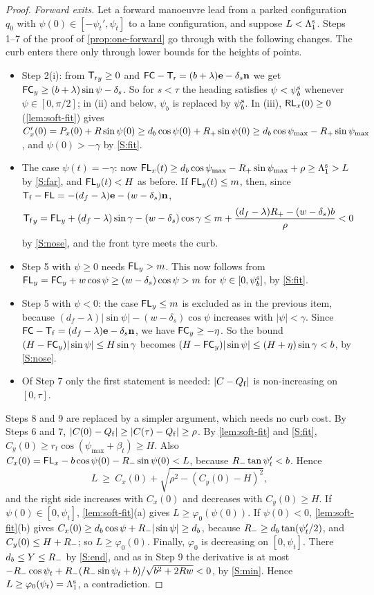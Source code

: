 \begin{proof}
\emph{Forward exits.}
Let a forward manoeuvre lead from a parked configuration $q_0$ with $\psi(0)\in[-\psi_t',\psi_t]$ to a lane configuration, and suppose $L<\Lambda_1^{\rm s}$.
Steps 1--7 of the proof of \cref{prop:one-forward} go through with the following changes.
The curb enters there only through lower bounds for the heights of points.
\begin{itemize}[nosep]
\item Step 2(i): from $\mathsf{T_r}_y\ge0$ and $\mathsf{FC}-\mathsf{T_r}=(b+\lambda)\mathbf{e}-\delta_s\mathbf{n}$ we get $\mathsf{FC}_y\ge(b+\lambda)\sin\psi-\delta_s$.
So for $s<\tau$ the heading satisfies $\psi<\psi_b^{\rm s}$ whenever $\psi\in[0,\pi/2]$; in (ii) and below, $\psi_b$ is replaced by $\psi_b^{\rm s}$.
In (iii), $\mathsf{RL}_x(0)\ge0$ (\cref{lem:soft-fit}) gives $C'_x(0)=P_x(0)+R\sin\psi(0)\ge d_b\cos\psi(0)+R_{+}\sin\psi(0)\ge d_b\cos\psi_{\max}-R_{+}\sin\psi_{\max}$, and $\psi(0)>-\gamma$ by \ref{S:fit}.
\item The case $\psi(t)=-\gamma$: now $\mathsf{FL}_x(t)\ge d_b\cos\psi_{\max}-R_{+}\sin\psi_{\max}+\rho\ge\Lambda_1^{\rm s}>L$ by \ref{S:far}, and $\mathsf{FL}_y(t)<H$ as before.
If $\mathsf{FL}_y(t)\le m$, then, since $\mathsf{T_f}-\mathsf{FL}=-(d_f-\lambda)\mathbf{e}-(w-\delta_s)\mathbf{n}$,
\[
  \mathsf{T_f}_y=\mathsf{FL}_y+(d_f-\lambda)\sin\gamma-(w-\delta_s)\cos\gamma\le m+\frac{(d_f-\lambda)R_{+}-(w-\delta_s)b}{\rho}<0
\]
by \ref{S:nose}, and the front tyre meets the curb.
\item Step 5 with $\psi\ge0$ needs $\mathsf{FL}_y>m$.
This now follows from $\mathsf{FL}_y=\mathsf{FC}_y+w\cos\psi\ge(w-\delta_s)\cos\psi>m$ for $\psi\in[0,\psi_b^{\rm s}]$, by \ref{S:fit}.
\item Step 5 with $\psi<0$: the case $\mathsf{FL}_y\le m$ is excluded as in the previous item, because $(d_f-\lambda)|\sin\psi|-(w-\delta_s)\cos\psi$ increases with $|\psi|<\gamma$.
Since $\mathsf{FC}-\mathsf{T_f}=(d_f-\lambda)\mathbf{e}-\delta_s\mathbf{n}$, we have $\mathsf{FC}_y\ge-\eta$.
So the bound $(H-\mathsf{FC}_y)|\sin\psi|\le H\sin\gamma$ becomes $(H-\mathsf{FC}_y)|\sin\psi|\le(H+\eta)\sin\gamma<b$, by \ref{S:nose}.
\item Of Step 7 only the first statement is needed: $|C-Q_{\mathrm f}|$ is non-increasing on $[0,\tau]$.
\end{itemize}
Steps 8 and 9 are replaced by a simpler argument, which needs no curb cost.
By Steps 6 and 7, $|C(0)-Q_{\mathrm f}|\ge|C(\tau)-Q_{\mathrm f}|\ge\rho$.
By \cref{lem:soft-fit} and \ref{S:fit}, $C_y(0)\ge r_t\cos(\psi_{\max}+\beta_t)\ge H$.
Also $C_x(0)=\mathsf{FL}_x-b\cos\psi(0)-R_{-}\sin\psi(0)<L$, because $R_{-}\tan\psi_t'<b$.
Hence
\[
  L\ \ge\ C_x(0)+\sqrt{\rho^2-(C_y(0)-H)^2},
\]
and the right side increases with $C_x(0)$ and decreases with $C_y(0)\ge H$.
If $\psi(0)\in[0,\psi_t]$, \cref{lem:soft-fit}(a) gives $L\ge\varphi_0(\psi(0))$.
If $\psi(0)<0$, \cref{lem:soft-fit}(b) gives $C_x(0)\ge d_b\cos\psi+R_{-}|\sin\psi|\ge d_b$, because $R_{-}\ge d_b\tan(\psi_t'/2)$, and $C_y(0)\le H+R_{-}$; so $L\ge\varphi_0(0)$.
Finally, $\varphi_0$ is decreasing on $[0,\psi_t]$.
There $d_b\le Y\le R_{-}$ by \ref{S:end}, and as in Step 9 the derivative is at most $-R_{-}\cos\psi_t+R_{-}(R_{-}\sin\psi_t+b)/\sqrt{b^2+2Rw}<0$, by \ref{S:min}.
Hence $L\ge\varphi_0(\psi_t)=\Lambda_1^{\rm s}$, a contradiction.


\end{proof}
